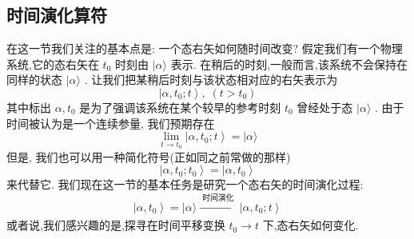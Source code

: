 \subsection{时间演化算符}
在这一节我们关注的基本点是: 一个态右矢如何随时间改变? 假定我们有一个物理系统,它的态右矢在 ${t}_{0}$ 时刻由 $|\alpha \rangle$ 表示. 在稍后的时刻,一般而言,该系统不会保持在同样的状态 $|\alpha \rangle$ . 让我们把某稍后时刻与该状态相对应的右矢表示为
\begin{equation}
	\left| {\alpha ,{t}_{0};t}\right\rangle ,\;\left( {t > {t}_{0}}\right)
\end{equation}
其中标出 $\alpha ,{t}_{0}$ 是为了强调该系统在某个较早的参考时刻 ${t}_{0}$ 曾经处于态 $|\alpha \rangle$ . 由于时间被认为是一个连续参量, 我们预期存在
\begin{equation}
	\mathop{\lim }\limits_{{t \rightarrow {t}_{0}}}\left| {\alpha ,{t}_{0};t}\right\rangle = |\alpha \rangle
\end{equation}
但是, 我们也可以用一种简化符号(正如同之前常做的那样)
\begin{equation}
	\left| {\alpha ,{t}_{0};{t}_{0}}\right\rangle = \left| {\alpha ,{t}_{0}}\right\rangle
\end{equation}
来代替它. 我们现在这一节的基本任务是研究一个态右矢的时间演化过程:
\begin{equation}
	\left| {\alpha ,{t}_{0}}\right\rangle = |\alpha \rangle \xrightarrow[]{\text{ 时间演化 }}\left| {\alpha ,{t}_{0};t}\right\rangle
\end{equation}
或者说,我们感兴趣的是,探寻在时间平移变换 ${t}_{0} \rightarrow t$ 下,态右矢如何变化.

